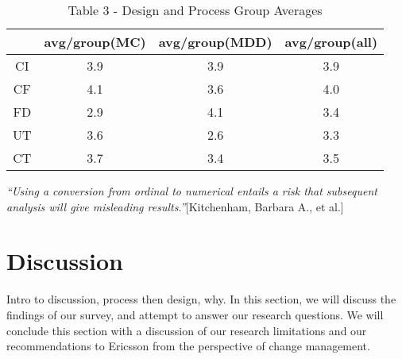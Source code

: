 \documentclass[final_report_innit.tex]{subfiles}
\begin{document}
\begin{table}[h]
\caption{Table 3 - Design and Process Group Averages}
\centering
\begin{tabular}{@{}c|c|c|c|@{}}
\cmidrule(l){2-4}
\multicolumn{1}{l|}{}    & \multicolumn{1}{l|}{avg/group(MC)} & \multicolumn{1}{l|}{avg/group(MDD)} & \multicolumn{1}{l|}{avg/group(all)} \\ \midrule
\multicolumn{1}{|c|}{CI} & 3.9                                & 3.9                                 & 3.9                                 \\ \midrule
\multicolumn{1}{|c|}{CF} & 4.1                                & 3.6                                 & 4.0                                 \\ \midrule
\multicolumn{1}{|c|}{FD} & 2.9                                & 4.1                                 & 3.4                                 \\ \midrule
\multicolumn{1}{|c|}{UT} & 3.6                                & 2.6                                 & 3.3                                 \\ \midrule
\multicolumn{1}{|c|}{CT} & 3.7                                & 3.4                                 & 3.5                                 \\ \bottomrule
\end{tabular}
\end{table}




















\textit{``Using a conversion from ordinal to numerical entails a risk that subsequent analysis will give misleading results.''}[Kitchenham, Barbara A., et al.]

\section{Discussion}

Intro to discussion, process then design, why.
In this section, we will discuss the findings of our survey, and attempt to answer our research questions. We will conclude this section with a discussion of our research limitations and our recommendations to Ericsson from the perspective of change management. 
\end{document}
